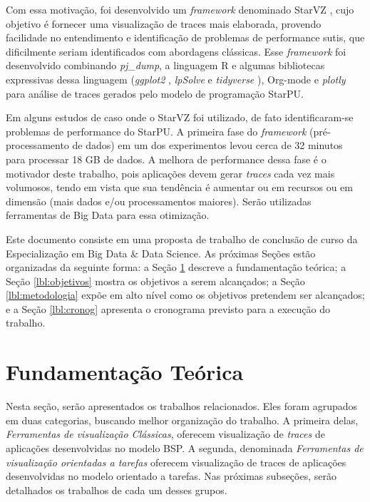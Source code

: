 \documentclass[ppgc,espec]{iiufrgs}
\begin{document}
Com essa motivação, foi desenvolvido um \emph{framework} denominado StarVZ \cite{ref:starvz}, cujo objetivo é fornecer uma visualização de traces mais elaborada, provendo facilidade no entendimento e identificação de problemas de performance sutis, que dificilmente seriam identificados com abordagens clássicas. Esse \emph{framework} foi desenvolvido combinando \emph{pj\_dump},  a linguagem R \cite{ref:rlanguage} e algumas bibliotecas expressivas dessa linguagem (\emph{ggplot2} \cite{ref:ggplot2}, \emph{lpSolve} \cite{ref:lpsolve} e \emph{tidyverse} \cite{ref:tidyverse}), Org-mode \cite{ref:org-mode} e \emph{plotly} para análise de traces gerados pelo modelo de programação StarPU.

Em alguns estudos de caso onde o StarVZ foi utilizado, de fato identificaram-se problemas de performance do StarPU. A primeira fase do \emph{framework} (pré-processamento de dados) em um dos experimentos levou cerca de 32 minutos para processar 18 GB de dados. A melhora de performance dessa fase é o motivador deste trabalho, pois aplicações devem gerar \emph{traces} cada vez mais volumosos, tendo em vista que sua tendência é aumentar ou em recursos ou em dimensão (mais dados e/ou processamentos maiores). Serão utilizadas ferramentas de Big Data para essa otimização.

Este documento consiste em uma proposta de trabalho de conclusão de curso da Especialização em Big Data \& Data Science. As próximas Seções estão organizadas da seguinte forma: a Seção \ref{lbl:fundamentacao} descreve a fundamentação teórica; a Seção \ref{lbl:objetivos} mostra os objetivos a serem alcançados; a Seção \ref{lbl:metodologia} expõe em alto nível como os objetivos pretendem ser alcançados; e a Seção \ref{lbl:cronog} apresenta o cronograma previsto para a execução do trabalho.

\chapter{Fundamentação Teórica} \label{lbl:fundamentacao}

Nesta seção, serão apresentados os trabalhos relacionados. Eles foram agrupados em duas categorias, buscando melhor organização do trabalho. A primeira delas, \emph{
Ferramentas de visualização Clássicas}, oferecem visualização de \emph{traces} de aplicações desenvolvidas no modelo BSP. A segunda, denominada \emph{Ferramentas de visualização orientadas a tarefas} oferecem visualização de traces de aplicações desenvolvidas no modelo orientado a tarefas. Nas próximas subseções, serão detalhados os trabalhos de cada um desses grupos.
\end{document}
